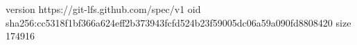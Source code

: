 version https://git-lfs.github.com/spec/v1
oid sha256:cc5318f1bf366a624eff2b373943fcfd524b23f59005dc06a59a090fd8808420
size 174916
